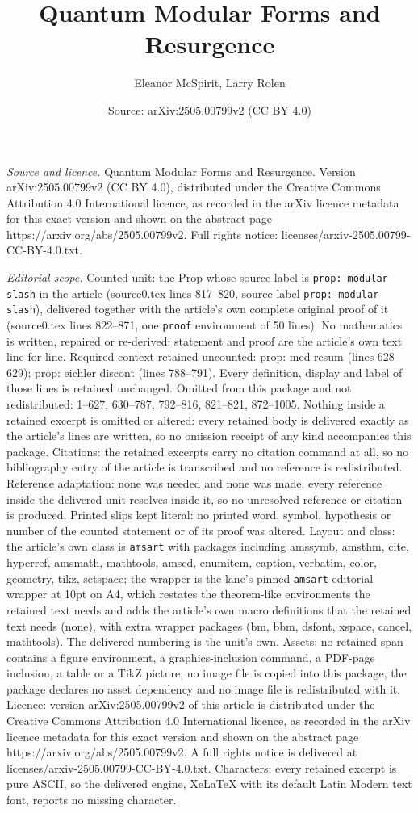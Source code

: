\documentclass[10pt,a4paper]{amsart}
\title[Quantum Modular Forms and Resurgence]{Quantum Modular Forms and Resurgence}
\author{Eleanor McSpirit, Larry Rolen}
\date{Source: arXiv:2505.00799v2 (CC BY 4.0)}
\begin{document}
\maketitle

\noindent\emph{Source and licence.} Quantum Modular Forms and Resurgence. Version arXiv:2505.00799v2 (CC BY 4.0), distributed under the Creative Commons Attribution 4.0 International licence, as recorded in the arXiv licence metadata for this exact version and shown on the abstract page https://arxiv.org/abs/2505.00799v2. Full rights notice: licenses/arxiv-2505.00799-CC-BY-4.0.txt.\par\smallskip

\noindent\textit{Editorial scope.} Counted unit: the Prop whose source label is \texttt{prop: modular slash} in the article (source0.tex lines 817--820, source label \texttt{prop: modular slash}), delivered together with the article's own complete original proof of it (source0.tex lines 822--871, one \texttt{proof} environment of 50 lines). No mathematics is written, repaired or re-derived: statement and proof are the article's own text line for line. Required context retained uncounted: prop: med resum (lines 628--629); prop: eichler discont (lines 788--791). Every definition, display and label of those lines is retained unchanged. Omitted from this package and not redistributed: 1--627, 630--787, 792--816, 821--821, 872--1005. Nothing inside a retained excerpt is omitted or altered: every retained body is delivered exactly as the article's lines are written, so no omission receipt of any kind accompanies this package. Citations: the retained excerpts carry no citation command at all, so no bibliography entry of the article is transcribed and no reference is redistributed. Reference adaptation: none was needed and none was made; every reference inside the delivered unit resolves inside it, so no unresolved reference or citation is produced. Printed slips kept literal: no printed word, symbol, hypothesis or number of the counted statement or of its proof was altered. Layout and class: the article's own class is \texttt{amsart} with packages including amssymb, amsthm, cite, hyperref, amsmath, mathtools, amscd, enumitem, caption, verbatim, color, geometry, tikz, setspace; the wrapper is the lane's pinned \texttt{amsart} editorial wrapper at 10pt on A4, which restates the theorem-like environments the retained text needs and adds the article's own macro definitions that the retained text needs (none), with extra wrapper packages (bm, bbm, dsfont, xspace, cancel, mathtools). The delivered numbering is the unit's own. Assets: no retained span contains a figure environment, a graphics-inclusion command, a PDF-page inclusion, a table or a TikZ picture; no image file is copied into this package, the package declares no asset dependency and no image file is redistributed with it. Licence: version arXiv:2505.00799v2 of this article is distributed under the Creative Commons Attribution 4.0 International licence, as recorded in the arXiv licence metadata for this exact version and shown on the abstract page https://arxiv.org/abs/2505.00799v2. A full rights notice is delivered at licenses/arxiv-2505.00799-CC-BY-4.0.txt. Characters: every retained excerpt is pure ASCII, so the delivered engine, XeLaTeX with its default Latin Modern text font, reports no missing character.
\end{document}
